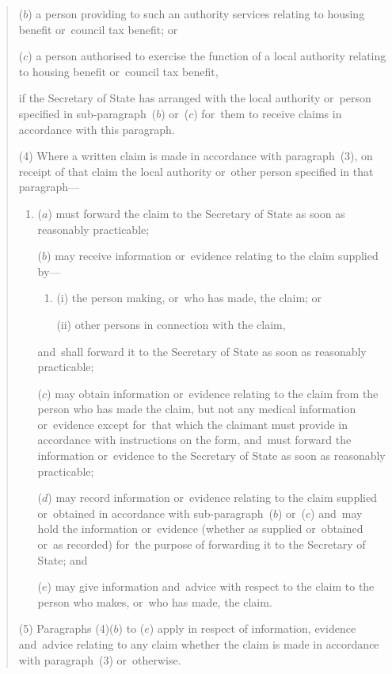 \documentclass[12pt,a4paper]{article}
\begin{document}
\begin{quotation}
\begin{enumerate}
($b$) a person providing to such an authority services relating to housing benefit or~council tax benefit; or

($c$) a person authorised to exercise the function of a local authority relating to housing benefit or~council tax benefit,
\end{enumerate}
if the Secretary of State has arranged with the local authority or~person specified in sub-paragraph~($b$)  or~($c$)  for~them to receive claims in accordance with this paragraph.

(4) Where a written claim is made in accordance with paragraph~(3), on receipt of that claim the local authority or~other person specified in that paragraph—
\begin{enumerate}\item[]
($a$) must forward the claim to the Secretary of State as soon as reasonably practicable;

($b$) may receive information or~evidence relating to the claim supplied by—
\begin{enumerate}\item[]
(i) the person making, or~who has made, the claim; or

(ii) other persons in connection with the claim,
\end{enumerate}
and~shall forward it to the Secretary of State as soon as reasonably practicable;

($c$) may obtain information or~evidence relating to the claim from the person who has made the claim, but not any medical information or~evidence except for~that which the claimant must provide in accordance with instructions on the form, and~must forward the information or~evidence to the Secretary of State as soon as reasonably practicable;

($d$) may record information or~evidence relating to the claim supplied or~obtained in accordance with sub-paragraph~($b$)  or~($c$)  and~may hold the information or~evidence (whether as supplied or~obtained or~as recorded) for~the purpose of forwarding it to the Secretary of State; and

($e$) may give information and~advice with respect to the claim to the person who makes, or~who has made, the claim.
\end{enumerate}

(5) Paragraphs (4)($b$)  to ($e$)  apply in respect of information, evidence and~advice relating to any claim whether the claim is made in accordance with paragraph~(3) or~otherwise.


\end{quotation}
\end{document}
